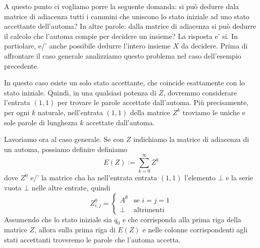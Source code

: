 A questo punto ci vogliamo porre la seguente domanda: 
si può dedurre dala matrice di adiacenza tutti i cammini che uniscono lo stato iniziale
ad uno stato accettante dell'automa?
In altre parole:
dalla matrice di adiacenza si può dedurre il calcolo che l'automa compie per decidere un insieme?
La risposta e' si.
In partiolare, e/' anche possibile dedurre l'intero insieme $X$ da decidere.
Prima di affrontare il caso generale
analizziamo questo problema nel caso dell'esempio precedente.
\begin{exam}
    In questo caso esiste un solo stato accettante,
    che coincide esattamente con lo stato iniziale.
    Quindi,
    in una qualsiasi potenza di $Z$,
    dovremmo considerare l'entrata $(1,1)$
    per trovare le parole accettate dall'automa.
    Più precisamente, per ogni $k$ naturale, nell'entrata $(1,1)$
    della matrice $Z^k$
    troviamo le uniche e sole parole
    di lunghezza $k$ accettate dall'automa.
\end{exam}
Lavoriamo ora al caso generale. Se con $Z$ indichiamo la matrice di adiacenza di un automa,
possiamo definire
definiamo
\[
E(Z)
:=
\sum_{k=0}^\infty Z^k
\]
dove $Z^0$ e/' la matrice 
cha ha nell'entrata entrata $(1,1)$ l'elemento $\bot$
e la serie vuota $\bot$ nelle altre entrate, quindi
\[
Z^0_{i,j}
=
\left\{
    \begin{matrix}
        A^\emptyset & \text{se } i=j=1
        \\
        \bot & \text{altrimenti}
    \end{matrix}
\right.
\]
Assumendo che lo stato iniziale sia $q_0$
e che corrisponda alla prima riga della matrice $Z$,
allora sulla prima riga di $E(Z)$ e nelle colonne corrispondenti
agli stati accettanti
troveremo le parole che l'automa accetta.
